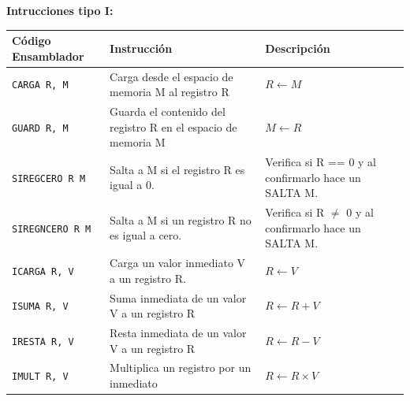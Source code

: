 \documentclass{article}
\begin{document}
\textbf{Intrucciones tipo I:}

\begin{longtable}{|p{}|p{}|p{}|}
  \hline
  \textbf{Código Ensamblador} & \textbf{Instrucción}                                                                            & \textbf{Descripción}                                                                                                \\
  \hline
  \texttt{CARGA R, M}         & Carga desde el espacio de memoria M al registro R                                               & $R \leftarrow M$                                                                                                    \\
  \hline
  \texttt{GUARD R, M}         & Guarda el contenido del registro R en el espacio de memoria M                                   & $M \leftarrow R$                                                                                                    \\
  \hline
  \texttt{SIREGCERO R M}      & Salta a M si el registro R es igual a 0.                                                        & Verifica si R == 0 y al confirmarlo hace un SALTA M.                                                                \\
  \hline
  \texttt{SIREGNCERO R M}     & Salta a M si un registro R no es igual a cero.                                                  & Verifica si R $\neq$ 0 y al confirmarlo hace un SALTA M.                                                            \\
  \hline
  \texttt{ICARGA R, V}        & Carga un valor inmediato V a un registro R.                                                     & $R \leftarrow V$                                                                                                    \\
  \hline
  \texttt{ISUMA R, V}         & Suma inmediata de un valor V a un registro R                                                    & $R \leftarrow R + V$                                                                                                \\
  \hline
  \texttt{IRESTA R, V}        & Resta inmediata de un valor V a un registro R                                                   & $R \leftarrow R - V$                                                                                                \\
  \hline
  \texttt{IMULT R, V}         & Multiplica un registro por un inmediato                                                         & $R \leftarrow R \times V$                                                                                           \\

\end{longtable}
\end{document}
